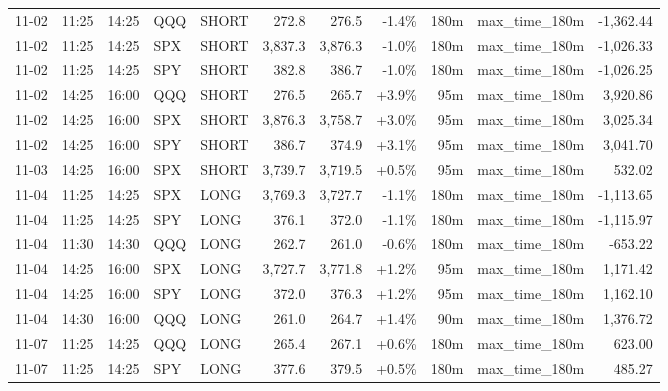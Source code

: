 \documentclass[11pt,a4paper,twoside]{article}
\begin{document}
\begin{center}
\begin{longtable}{>{\color{txtmain}}l l l l l r r r r >{\color{txtmain}}l r}
11-02 & 11:25 & 14:25 & QQQ & SHORT & 272.8 & 276.5 & \textcolor{lossred}{-1.4\%} & 180m & max\_time\_180m & \textcolor{lossred}{-1,362.44} \\
11-02 & 11:25 & 14:25 & SPX & SHORT & 3,837.3 & 3,876.3 & \textcolor{lossred}{-1.0\%} & 180m & max\_time\_180m & \textcolor{lossred}{-1,026.33} \\
11-02 & 11:25 & 14:25 & SPY & SHORT & 382.8 & 386.7 & \textcolor{lossred}{-1.0\%} & 180m & max\_time\_180m & \textcolor{lossred}{-1,026.25} \\
11-02 & 14:25 & 16:00 & QQQ & SHORT & 276.5 & 265.7 & \textcolor{wingreen}{+3.9\%} & 95m & max\_time\_180m & \textcolor{wingreen}{3,920.86} \\
11-02 & 14:25 & 16:00 & SPX & SHORT & 3,876.3 & 3,758.7 & \textcolor{wingreen}{+3.0\%} & 95m & max\_time\_180m & \textcolor{wingreen}{3,025.34} \\
11-02 & 14:25 & 16:00 & SPY & SHORT & 386.7 & 374.9 & \textcolor{wingreen}{+3.1\%} & 95m & max\_time\_180m & \textcolor{wingreen}{3,041.70} \\
11-03 & 14:25 & 16:00 & SPX & SHORT & 3,739.7 & 3,719.5 & \textcolor{wingreen}{+0.5\%} & 95m & max\_time\_180m & \textcolor{wingreen}{532.02} \\
11-04 & 11:25 & 14:25 & SPX & LONG & 3,769.3 & 3,727.7 & \textcolor{lossred}{-1.1\%} & 180m & max\_time\_180m & \textcolor{lossred}{-1,113.65} \\
11-04 & 11:25 & 14:25 & SPY & LONG & 376.1 & 372.0 & \textcolor{lossred}{-1.1\%} & 180m & max\_time\_180m & \textcolor{lossred}{-1,115.97} \\
11-04 & 11:30 & 14:30 & QQQ & LONG & 262.7 & 261.0 & \textcolor{lossred}{-0.6\%} & 180m & max\_time\_180m & \textcolor{lossred}{-653.22} \\
11-04 & 14:25 & 16:00 & SPX & LONG & 3,727.7 & 3,771.8 & \textcolor{wingreen}{+1.2\%} & 95m & max\_time\_180m & \textcolor{wingreen}{1,171.42} \\
11-04 & 14:25 & 16:00 & SPY & LONG & 372.0 & 376.3 & \textcolor{wingreen}{+1.2\%} & 95m & max\_time\_180m & \textcolor{wingreen}{1,162.10} \\
11-04 & 14:30 & 16:00 & QQQ & LONG & 261.0 & 264.7 & \textcolor{wingreen}{+1.4\%} & 90m & max\_time\_180m & \textcolor{wingreen}{1,376.72} \\
11-07 & 11:25 & 14:25 & QQQ & LONG & 265.4 & 267.1 & \textcolor{wingreen}{+0.6\%} & 180m & max\_time\_180m & \textcolor{wingreen}{623.00} \\
11-07 & 11:25 & 14:25 & SPY & LONG & 377.6 & 379.5 & \textcolor{wingreen}{+0.5\%} & 180m & max\_time\_180m & \textcolor{wingreen}{485.27} \\

\end{longtable}
\end{center}
\end{document}
